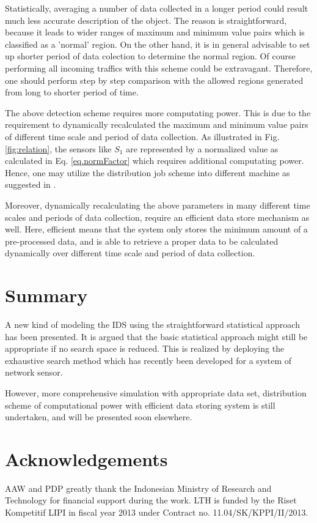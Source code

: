 \documentclass[conference,10pt,a4paper]{IEEEtran}
\begin{document}
Statistically, averaging a number of data collected in a longer period could result much less accurate  description of the object. The reason is straightforward, because it leads to wider ranges of maximum and minimum value pairs which is classified as a 'normal' region. On the other hand, it is in general advisable to set up shorter period of data colection to determine the normal region. Of course performing all incoming traffics with this scheme could be extravagant. Therefore, one should perform step by step comparison with the allowed regions generated from long to shorter period of time.

The above detection scheme requires more computating power. This is due to the requirement to dynamically recalculated the maximum and minimum value pairs of different time scale and period of data collection. As illustrated in Fig. \ref{fig:relation}, the sensors like $S_{1}$ are represented by a normalized value as calculated in Eq. \ref{eq.normFactor} which requires additional computating power. Hence, one may utilize the distribution job scheme into different machine as suggested in \cite{arya}.

Moreover, dynamically recalculating the above parameters in many different time scales and periods of data collection, require an efficient data store mechanism as well. Here, efficient means that the system only stores the minimum amount of a pre-processed data, and is able to retrieve a proper data to be calculated dynamically over different time scale and period of data collection.

\section{Summary}
\label{sec:summary}

A new kind of modeling the IDS using the straightforward statistical approach has been presented. It is argued that the basic statistical approach might still be appropriate if no search space is reduced. This is realized by deploying the exhaustive search method which has recently been developed for a system of network sensor. 

However, more comprehensive simulation with appropriate data set, distribution scheme of computational power with efficient data storing system is still undertaken, and will be presented soon elsewhere. 

\section*{Acknowledgements}

AAW and PDP greatly thank the Indonesian Ministry of Research and Technology for financial support during the work. LTH  is funded by the Riset Kompetitif LIPI in fiscal year 2013 under Contract no.  11.04/SK/KPPI/II/2013.



\end{document}
